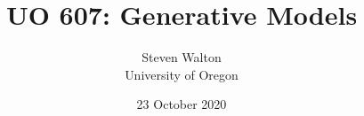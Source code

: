 \documentclass[pdf,11pt]{beamer}
\title{UO 607: Generative Models}
\author{Steven Walton\\ \small University of Oregon}
\date{23 October 2020}
\begin{document}
\frame{\titlepage}


\end{document}
